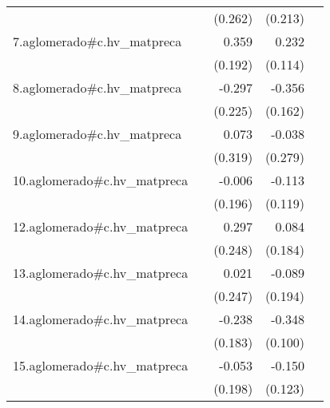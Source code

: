 {\begin{longtable}{l*{4}{D{.}{.}{-1}}}
            &                     &     (0.262)         &     (0.213)         &                     \\
\addlinespace
7.aglomerado#c.hv\_matpreca&                     &       0.359         &       0.232\sym{*}  &                     \\
            &                     &     (0.192)         &     (0.114)         &                     \\
\addlinespace
8.aglomerado#c.hv\_matpreca&                     &      -0.297         &      -0.356\sym{*}  &                     \\
            &                     &     (0.225)         &     (0.162)         &                     \\
\addlinespace
9.aglomerado#c.hv\_matpreca&                     &       0.073         &      -0.038         &                     \\
            &                     &     (0.319)         &     (0.279)         &                     \\
\addlinespace
10.aglomerado#c.hv\_matpreca&                     &      -0.006         &      -0.113         &                     \\
            &                     &     (0.196)         &     (0.119)         &                     \\
\addlinespace
12.aglomerado#c.hv\_matpreca&                     &       0.297         &       0.084         &                     \\
            &                     &     (0.248)         &     (0.184)         &                     \\
\addlinespace
13.aglomerado#c.hv\_matpreca&                     &       0.021         &      -0.089         &                     \\
            &                     &     (0.247)         &     (0.194)         &                     \\
\addlinespace
14.aglomerado#c.hv\_matpreca&                     &      -0.238         &      -0.348\sym{***}&                     \\
            &                     &     (0.183)         &     (0.100)         &                     \\
\addlinespace
15.aglomerado#c.hv\_matpreca&                     &      -0.053         &      -0.150         &                     \\
            &                     &     (0.198)         &     (0.123)         &                     \\

\end{longtable}}
